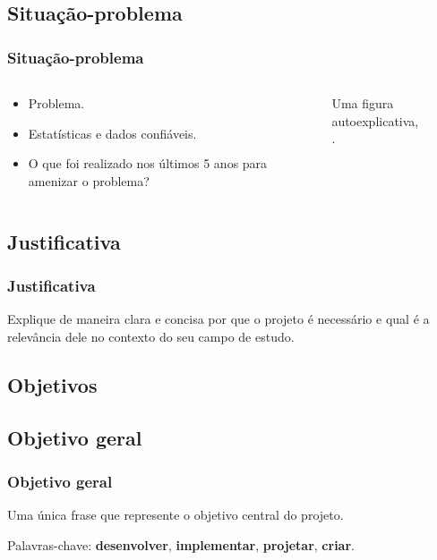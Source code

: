 \documentclass[hyperref={colorlinks=true,    
allcolors = blue,citecolor=blue}]{beamer} %
\begin{document}
\begin{frame}
\subsection{Situação-problema}
\frametitle{Situação-problema}


\begin{columns}
    \begin{column}{0.47\textwidth}
        \begin{itemize}
            \item Problema.
            \item Estatísticas e dados confiáveis.
            \item O que foi realizado nos últimos 5 anos para amenizar o problema?
        \end{itemize}
    \end{column}
    \begin{column}{0.5\textwidth}
        \begin{figure}
            \centering            
        \caption{Uma figura autoexplicativa, \cite{geogebra}.}
        \label{fig:enter-label}
        \end{figure}
    \end{column}
\end{columns}

\end{frame}
\begin{frame}
\subsection{Justificativa}
\frametitle{Justificativa}

Explique de maneira clara e concisa por que o projeto é necessário e qual é a relevância dele no contexto do seu campo de estudo.

\end{frame}
\begin{frame}
\section{Objetivos}
\subsection{Objetivo geral}
\frametitle{Objetivo geral}

Uma única frase que represente o objetivo central do projeto.

Palavras-chave: \textbf{desenvolver}, \textbf{implementar}, \textbf{projetar}, \textbf{criar}.

\end{frame}
\end{document}
